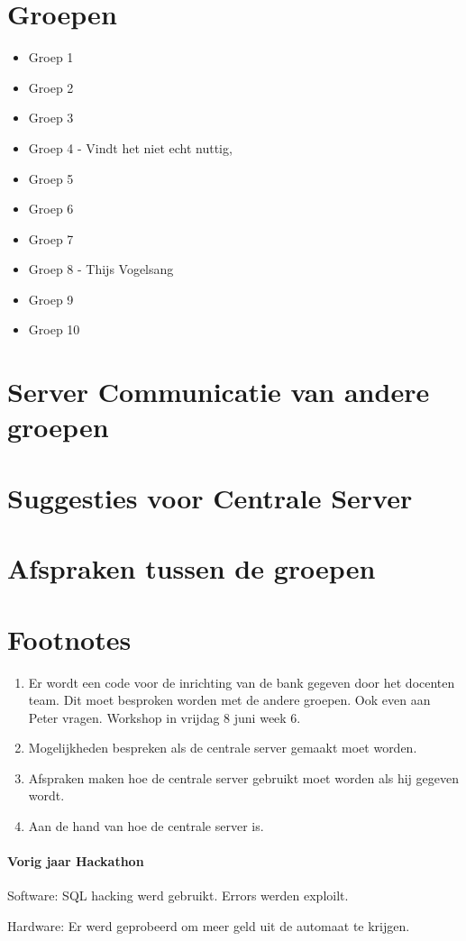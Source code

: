 \documentclass{article}
\begin{document}
\section{Groepen}
\begin{itemize}
	\item Groep 1
	\item Groep 2
	\item Groep 3
	\item Groep 4 - Vindt het niet echt nuttig,
	\item Groep 5
	\item Groep 6
	\item Groep 7
	\item Groep 8 - Thijs Vogelsang
	\item Groep 9
	\item Groep 10
\end{itemize}

\section{Server Communicatie van andere groepen}

\section{Suggesties voor Centrale Server}

\section{Afspraken tussen de groepen}

\section{Footnotes}
\begin{enumerate}
	\item Er wordt een code voor de inrichting van de bank gegeven door het docenten team.
	Dit moet besproken worden met de andere groepen. Ook even aan Peter vragen. 
	Workshop in vrijdag 8 juni week 6.
	\item Mogelijkheden bespreken als de centrale server gemaakt moet worden.
	\item Afspraken maken hoe de centrale server gebruikt moet worden als hij
	gegeven wordt.
	\item Aan de hand van hoe de centrale server is.
\end{enumerate}

\paragraph{Vorig jaar Hackathon}
Software:
SQL hacking werd gebruikt.
Errors werden exploilt.

Hardware:
Er werd geprobeerd om meer geld uit de automaat te krijgen.
\end{document}
